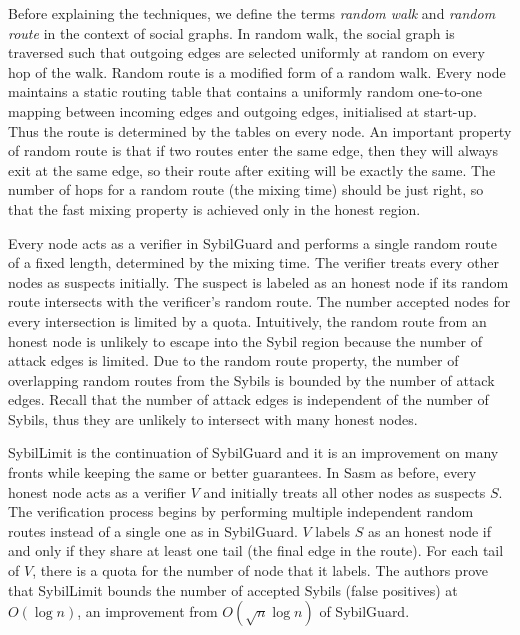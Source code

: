 
Before explaining the techniques, we define the terms \emph{random walk} and
\emph{random route} in the context of social graphs. In random walk, the social
graph is traversed such that outgoing edges are selected uniformly at
random on every hop of the walk. Random route is a modified form of a random
walk. Every node maintains a static routing table that contains a uniformly
random one-to-one mapping between incoming edges and outgoing edges, initialised
at start-up. Thus the route is determined by the tables on every node. An
important property of random route is that if two routes enter the same edge,
then they will always exit at the same edge, so their route after exiting will
be exactly the same. The number of hops for a random route (the mixing time)
should be just right, so that the fast mixing property is achieved only in the
honest region.

Every node acts as a verifier in SybilGuard\cite{yu2006sybilguard} and performs
a single random route of a fixed length, determined by the mixing time. The
verifier treats every other nodes as suspects initially. The suspect is labeled
as an honest node if its random route intersects with the verificer's random
route. The number accepted nodes for every intersection is limited by a quota.
Intuitively, the random route from an honest node is unlikely to escape into the
Sybil region because the number of attack edges is limited. Due to the random
route property, the number of overlapping random routes from the
Sybils is bounded by the number of attack edges. Recall that the number of
attack edges is independent of the number of Sybils, thus they are unlikely to
intersect with many honest nodes.

SybilLimit\cite{yu2008sybillimit} is the continuation of SybilGuard and it is an
improvement on many fronts while keeping the same or better guarantees. In Sasm
as before, every honest node acts as a verifier $V$ and initially treats all
other nodes as suspects $S$. The verification process begins by performing
multiple independent random routes instead of a single one as in SybilGuard. $V$
labels $S$ as an honest node if and only if they share at least one tail (the
final edge in the route). For each tail of $V$, there is a quota for the number
of node that it labels. The authors prove that SybilLimit bounds the number of
accepted Sybils (false positives) at $O(\log{n})$, an improvement from
$O(\sqrt{n} \log{n})$ of SybilGuard.

